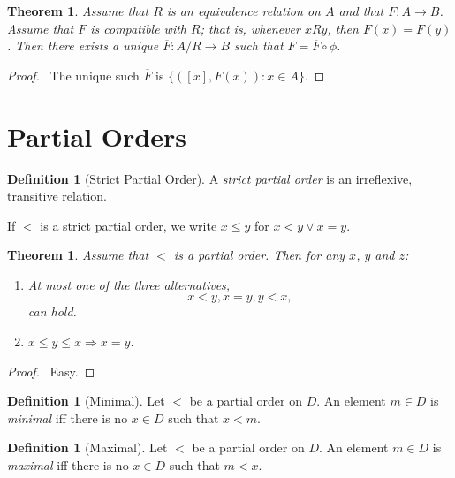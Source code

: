 \documentclass{article}
\let\qed\relax
\newtheorem{theorem}[axiom]{Theorem}
\theoremstyle{definition}
\newtheorem{definition}[axiom]{Definition}
\begin{document}
    \begin{theorem}
        Assume that $R$ is an equivalence relation on $A$ and that $F : A \rightarrow B$.
        Assume that $F$ is \emph{compatible} with $R$; that is, whenever $xRy$, then $F(x) = F(y)$.
        Then there exists a unique $\overline{F} : A / R \rightarrow B$ such that $F = \overline{F} \circ \phi$.
    \end{theorem}

    \begin{proof}
        \pf\ The unique such $\overline{F}$ is $\{ ([x],F(x)) : x \in A \}$. \qed
    \end{proof}

    \section{Partial Orders}

    \begin{definition}[Strict Partial Order]
        A \emph{strict partial order} is an irreflexive, transitive relation.

        If $<$ is a strict partial order, we write $x \leq y$ for $x < y \vee x = y$.
    \end{definition}

    \begin{theorem}
        Assume that $<$ is a partial order. Then for any $x$, $y$ and $z$:
        \begin{enumerate}
            \item \emph{At most} one of the three alternatives,
            \[ x < y, x = y, y < x, \]
            can hold.
            \item $x \leq y \leq x \Rightarrow x = y$.
        \end{enumerate}
    \end{theorem}

    \begin{proof}
        \pf\ Easy. \qed
    \end{proof}

    \begin{definition}[Minimal]
        Let $<$ be a partial order on $D$. An element $m \in D$ is \emph{minimal} iff there is no
        $x \in D$ such that $x < m$.
    \end{definition}

    \begin{definition}[Maximal]
        Let $<$ be a partial order on $D$. An element $m \in D$ is \emph{maximal} iff there is no
        $x \in D$ such that $m < x$.
    \end{definition}
\end{document}
